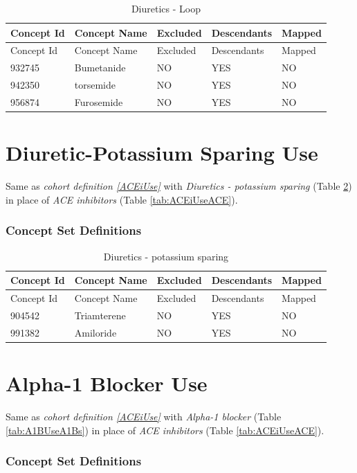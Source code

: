 \documentclass[10.5pt]{book}
\theoremstyle{definition}
\theoremstyle{definition}
\theoremstyle{definition}
\theoremstyle{remark}
\begin{document}
\begin{longtable}[]{@{}lllll@{}}
\caption{\label{tab:DLoopUseDLoops} Diuretics - Loop}\tabularnewline
\toprule
Concept Id & Concept Name & Excluded & Descendants &
Mapped\tabularnewline
\midrule
\endfirsthead
\toprule
Concept Id & Concept Name & Excluded & Descendants &
Mapped\tabularnewline
\midrule
\endhead
932745 & Bumetanide & NO & YES & NO\tabularnewline
942350 & torsemide & NO & YES & NO\tabularnewline
956874 & Furosemide & NO & YES & NO\tabularnewline
\bottomrule
\end{longtable}

\section{Diuretic-Potassium Sparing Use}\label{DPUse}

Same as \emph{cohort definition \ref{ACEiUse}} with \emph{Diuretics -
potassium sparing} (Table \ref{tab:DPUseDPs}) in place of \emph{ACE
inhibitors} (Table \ref{tab:ACEiUseACE}).

\subsubsection*{Concept Set
Definitions}\label{concept-set-definitions-13}

\begin{longtable}[]{@{}lllll@{}}
\caption{\label{tab:DPUseDPs} Diuretics - potassium sparing}\tabularnewline
\toprule
Concept Id & Concept Name & Excluded & Descendants &
Mapped\tabularnewline
\midrule
\endfirsthead
\toprule
Concept Id & Concept Name & Excluded & Descendants &
Mapped\tabularnewline
\midrule
\endhead
904542 & Triamterene & NO & YES & NO\tabularnewline
991382 & Amiloride & NO & YES & NO\tabularnewline
\bottomrule
\end{longtable}

\section{Alpha-1 Blocker Use}\label{A1BUse}

Same as \emph{cohort definition \ref{ACEiUse}} with \emph{Alpha-1
blocker} (Table \ref{tab:A1BUseA1Bs}) in place of \emph{ACE inhibitors}
(Table \ref{tab:ACEiUseACE}).

\subsubsection*{Concept Set
Definitions}\label{concept-set-definitions-14}
\end{document}
